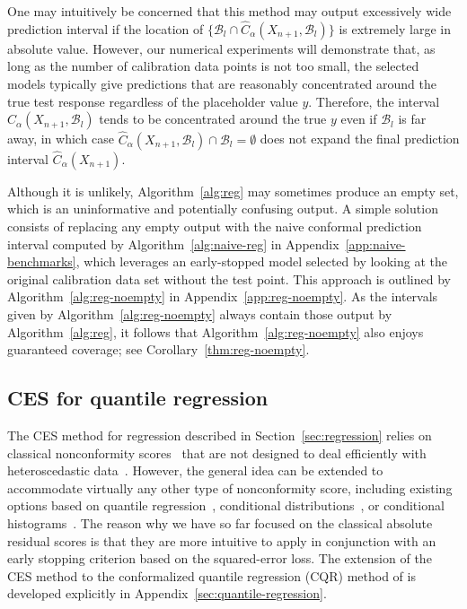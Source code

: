 One may intuitively be concerned that this method may output excessively wide prediction interval if the location of $\{\mathcal{B}_l \cap \hat{C}_\alpha(X_{n+1}, \mathcal{B}_l)\}$ is extremely large in absolute value.
However, our numerical experiments will demonstrate that, as long as the number of calibration data points is not too small, the selected models typically give predictions that are reasonably concentrated around the true test response regardless of the placeholder value $y$. Therefore, the interval $\hat{C}_\alpha(X_{n+1}, \mathcal{B}_l)$ tends to be concentrated around the true $y$ even if $\mathcal{B}_l$ is far away, in which case $\hat{C}_\alpha(X_{n+1}, \mathcal{B}_l) \cap \mathcal{B}_l = \emptyset$ does not expand the final prediction interval $\hat{C}_\alpha(X_{n+1})$.


Although it is unlikely, Algorithm~\ref{alg:reg} may sometimes produce an empty set, which is an uninformative and potentially confusing output. A simple solution consists of replacing any empty output with the naive conformal prediction interval computed by Algorithm~\ref{alg:naive-reg} in Appendix~\ref{app:naive-benchmarks}, which leverages an early-stopped model selected by looking at the original calibration data set without the test point.
This approach is outlined by Algorithm~\ref{alg:reg-noempty} in Appendix~\ref{app:reg-noempty}.
As the intervals given by Algorithm~\ref{alg:reg-noempty} always contain those output by Algorithm~\ref{alg:reg}, it follows that Algorithm~\ref{alg:reg-noempty} also enjoys guaranteed coverage; see Corollary~\ref{thm:reg-noempty}.


\subsection{CES for quantile regression} \label{sec:regression-cqr-short}

The CES method for regression described in Section~\ref{sec:regression} relies on classical nonconformity scores~\cite{vovk2005algorithmic,lei2016RegressionPS} that are not designed to deal efficiently with heteroscedastic data~\cite{romano2019conformalized,sesia2020comparison}.
However, the general idea can be extended to accommodate virtually any other type of nonconformity score, including existing options based on quantile regression~\cite{romano2019conformalized}, conditional distributions~\cite{chernozhukov2019distributional,izbicki2019flexible}, or conditional histograms~\cite{sesia2021conformal}.
The reason why we have so far focused on the classical absolute residual scores is that they are more intuitive to apply in conjunction with an early stopping criterion based on the squared-error loss.
The extension of the CES method to the conformalized quantile regression (CQR) method of \citet{romano2019conformalized} is developed explicitly in Appendix~\ref{sec:quantile-regression}.


